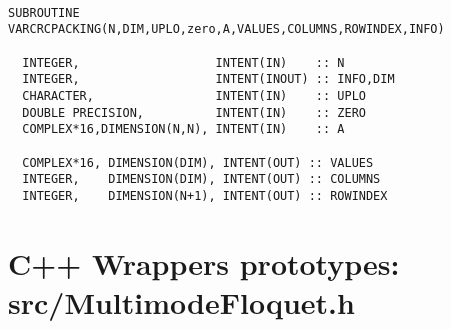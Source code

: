 \documentclass[10pt,a4paper]{article}
\begin{document}
\begin{verbatim}

SUBROUTINE VARCRCPACKING(N,DIM,UPLO,zero,A,VALUES,COLUMNS,ROWINDEX,INFO)

  INTEGER,                   INTENT(IN)    :: N
  INTEGER,                   INTENT(INOUT) :: INFO,DIM
  CHARACTER,                 INTENT(IN)    :: UPLO
  DOUBLE PRECISION,          INTENT(IN)    :: ZERO
  COMPLEX*16,DIMENSION(N,N), INTENT(IN)    :: A

  COMPLEX*16, DIMENSION(DIM), INTENT(OUT) :: VALUES
  INTEGER,    DIMENSION(DIM), INTENT(OUT) :: COLUMNS
  INTEGER,    DIMENSION(N+1), INTENT(OUT) :: ROWINDEX

\end{verbatim}

\section{C++ Wrappers prototypes: src/MultimodeFloquet.h}
\end{document}
